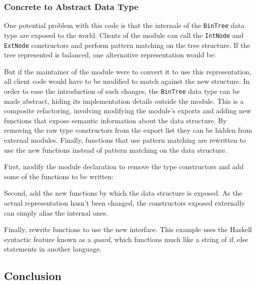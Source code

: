 \documentclass{article}
\begin{document}


\subsubsection{Concrete to Abstract Data Type}

One potential problem with this code is that the internals of the \verb!BinTree! data type are exposed to the world.
Clients of the module can call the \verb!IntNode! and \verb!ExtNode! constructors and perform pattern matching on the tree structure.
If the tree represented is balanced, one alternative representation would be:



\noindent But if the maintainer of the module were to convert it to use this representation, all client code would have to be modified to match against the new structure\cite{thompson2005refactoring}.
In order to ease the introduction of such changes, the \verb!BinTree! data type can be made abstract, hiding its implementation details outside the module.
This is a composite refactoring, involving modifying the module's exports and adding new functions that expose semantic information about the data structure.
By removing the raw type constructors from the export list they can be hidden from external modules.
Finally, functions that use pattern matching are rewritten to use the new functions instead of pattern matching on the data structure.

First, modify the module declaration to remove the type constructors and add some of the functions to be written:



Second, add the new functions by which the data structure is exposed.  As the actual representation hasn't been changed, the constructors exposed externally can simply alias the internal ones.



Finally, rewrite functions to use the new interface.  This example uses the Haskell syntactic feature known as a \textit{guard}, which functions much like a string of if..else statements in another language.



\subsection{Conclusion}
\end{document}
